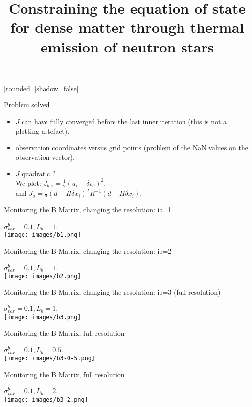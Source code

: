 \documentclass[francais]{beamer}
\title[Nicolas Baillot d'Etivaux]{Constraining the equation of state for dense matter through thermal emission of neutron stars}
\begin{document}
[rounded]%
[shadow=false]


\begin{frame}{Problem solved}
\begin{itemize}
 \item $J$ can have fully converged before the last inner iteration (this is not a plotting artefact).\\
 \item observation coordinates versus grid points (problem of the NaN values on the observation vector).\\
 \item $J$ quadratic ?\\
 We plot: $J_{b,i}=\frac{1}{2}(u_i-\delta v_b)^2$.\\
 and $J_o=\frac{1}{2}(d-H \delta x_i)^T R^{-1} (d-H \delta x_i).$ 
\end{itemize}
\end{frame}



\begin{frame}{Monitoring the B Matrix, changing the resolution: io=1}
\begin{center}
$\sigma^b_{var}=0.1 , L_b=1$.\\
 \texttt{[image: images/b1.png]}
\end{center}
\end{frame}
\begin{frame}{Monitoring the B Matrix, changing the resolution: io=2}
\begin{center}
$\sigma^b_{var}=0.1 , L_b=1$.\\
 \texttt{[image: images/b2.png]}
\end{center}
\end{frame}
\begin{frame}{Monitoring the B Matrix, changing the resolution: io=3 (full resolution)}
\begin{center}
$\sigma^b_{var}=0.1 , L_b=1$.\\
 \texttt{[image: images/b3.png]}
\end{center}
\end{frame}
\begin{frame}{Monitoring the B Matrix, full resolution}
\begin{center}
$\sigma^b_{var}=0.1 , L_b=0.5$.\\
 \texttt{[image: images/b3-0-5.png]}
\end{center}
\end{frame}
\begin{frame}{Monitoring the B Matrix, full resolution}
\begin{center}
$\sigma^b_{var}=0.1 , L_b=2$.\\
 \texttt{[image: images/b3-2.png]}
\end{center}
\end{frame}
\end{document}
